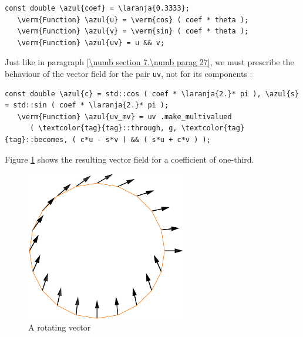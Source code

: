 \begin{Verbatim}[commandchars=\\\{\},formatcom=\small\tt,frame=single,
   label=parag-\ref{\numb section 7.\numb parag 28}.cpp,rulecolor=\color{moldura},
   baselinestretch=0.94,framesep=2mm                                              ]
   const double \azul{coef} = \laranja{0.3333};
   \verm{Function} \azul{u} = \verm{cos} ( coef * theta );
   \verm{Function} \azul{v} = \verm{sin} ( coef * theta );
   \verm{Function} \azul{uv} = u && v;
\end{Verbatim}

Just like in paragraph \ref{\numb section 7.\numb parag 27}, we must prescribe the behaviour of
the vector field for the pair {\small\tt uv}, not for its components :

\begin{Verbatim}[commandchars=\\\{\},formatcom=\small\tt,frame=single,
   label=parag-\ref{\numb section 7.\numb parag 28}.cpp,rulecolor=\color{moldura},
   baselinestretch=0.94,framesep=2mm                                              ]
   const double \azul{c} = std::cos ( coef * \laranja{2.}* pi ), \azul{s} = std::sin ( coef * \laranja{2.}* pi );
   \verm{Function} \azul{uv_mv} = uv .make_multivalued
      ( \textcolor{tag}{tag}::through, g, \textcolor{tag}{tag}::becomes, ( c*u - s*v ) && ( s*u + c*v ) );
\end{Verbatim}

Figure \ref{\numb section 7.\numb fig 24} shows
the resulting vector field for a coefficient of one-third.

\begin{figure}[ht] \centering
  \includegraphics[width=70mm]{circle-conca-coef.eps}
  \caption{A rotating vector}
  \label{\numb section 7.\numb fig 24}
\end{figure}

